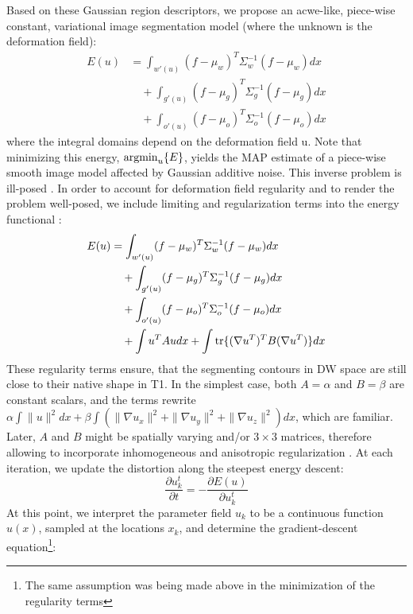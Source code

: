 %
Based on these Gaussian region descriptors, we propose an \ac{acwe}-like, 
piece-wise constant, variational image segmentation model (where the 
unknown is the deformation field)\cite{chan_active_2001}:
\begin{align}
E(u) &= \int_{w'(u)} (f-\mu_w)^T\Sigma_w^{-1}(f-\mu_w) dx\nonumber\\
&\quad +\int_{g'(u)} (f-\mu_g)^T\Sigma_g^{-1}(f-\mu_g) dx\\
&\quad +\int_{o'(u)} (f-\mu_o)^T\Sigma_o^{-1}(f-\mu_o) dx\nonumber
\end{align}
where the integral domains depend on the deformation field u. Note that 
minimizing this energy, $\operatorname{argmin}_u\{E\}$, yields the MAP estimate of a 
piece-wise smooth image model affected by Gaussian additive noise. This 
inverse problem is ill-posed \cite{hadamard_sur_1902,bertero_ill-posed_1988}.
In order to account for deformation field regularity and to render the 
problem well-posed, we include limiting and regularization terms into 
the energy functional 
\cite{tichonov_solution_1963,morozov_linear_1975}:
\begin{align}
E(u) &= \int_{w'(u)} (f-\mu_w)^T\Sigma_w^{-1}(f-\mu_w) dx\nonumber\\
&\quad +\int_{g'(u)} (f-\mu_g)^T\Sigma_g^{-1}(f-\mu_g) dx\\
&\quad +\int_{o'(u)} (f-\mu_o)^T\Sigma_o^{-1}(f-\mu_o) dx\nonumber\\
&\quad +\int u^T A u dx + \int \operatorname{tr}\{(\nabla u^T)^T B (\nabla u^T)\} dx\nonumber
\end{align}
These regularity terms ensure, that the segmenting contours in DW space 
are still close to their native shape in T1. In the simplest case, both 
$A=\alpha$ and $B=\beta$ are constant scalars, and the terms rewrite 
$\alpha \int  \|u\|^2 dx + \beta \int \left( \|\nabla u_x\|^2 +
\|\nabla u_y\|^2 + \|\nabla u_z\|^2\right) dx$, which are familiar. 
Later, $A$ and $B$ might be spatially varying and/or $3\times 3$ 
matrices, therefore allowing to incorporate inhomogeneous and 
anisotropic regularization \cite{nagel_investigation_1986}.
%
At each iteration, we update the distortion along the steepest energy descent:
%
\begin{equation}
\frac{\partial u_k^t}{\partial t} = -\frac{\partial E(u)}{\partial u_k^t}
\end{equation}
%
At this point, we interpret the parameter field $u_k$ to be a 
continuous function $u(x)$, sampled at the locations $x_k$, and 
determine the gradient-descent equation\footnote{The same assumption 
was being made above in the minimization of the regularity terms}:
